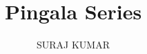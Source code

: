 \documentclass[journal,12pt,twocolumn]{IEEEtran}
\begin{document}
\let\StandardTheFigure\thefigure
\renewcommand{\thefigure}{\theproblem}



\def\putbox#1#2#3{\makebox[0in][l]{\makebox[#1][l]{}\raisebox{\baselineskip}[0in][0in]{\raisebox{#2}[0in][0in]{#3}}}}
     \def\rightbox#1{\makebox[0in][r]{#1}}
     \def\centbox#1{\makebox[0in]{#1}}
     \def\topbox#1{\raisebox{-\baselineskip}[0in][0in]{#1}}
     \def\midbox#1{\raisebox{-0.5\baselineskip}[0in][0in]{#1}}

\vspace{3cm}

\title{ 
Pingala Series
}


%
%
%

\author{ SURAJ KUMAR %
}
% 
%
\end{document}
